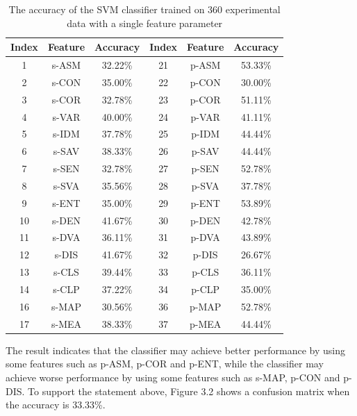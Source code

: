 \begin{table}[!t]
\begin{center}
\renewcommand{\arraystretch}{0.5}
\begin{tabular}{||c c c c c c ||}
\hline
Index & Feature & Accuracy & Index & Feature & Accuracy \\[0.7ex]
\hline\hline
1 & s-ASM & 32.22\% & 21 & p-ASM & 53.33\% \\
2 & s-CON & 35.00\% & 22 & p-CON & 30.00\% \\
3 & s-COR & 32.78\% & 23 & p-COR & 51.11\% \\
4 & s-VAR & 40.00\% & 24 & p-VAR & 41.11\% \\
5 & s-IDM & 37.78\% & 25 & p-IDM & 44.44\% \\
6 & s-SAV & 38.33\% & 26 & p-SAV & 44.44\% \\
7 & s-SEN & 32.78\% & 27 & p-SEN & 52.78\% \\
8 & s-SVA & 35.56\% & 28 & p-SVA & 37.78\% \\
9 & s-ENT & 35.00\% & 29 & p-ENT & 53.89\% \\
10 & s-DEN & 41.67\% & 30 & p-DEN & 42.78\% \\
11 & s-DVA & 36.11\% & 31 & p-DVA & 43.89\% \\
12 & s-DIS & 41.67\% & 32 & p-DIS & 26.67\% \\
13 & s-CLS & 39.44\% & 33 & p-CLS & 36.11\% \\
14 & s-CLP & 37.22\% & 34 & p-CLP & 35.00\% \\
16 & s-MAP & 30.56\% & 36 & p-MAP & 52.78\% \\
17 & s-MEA & 38.33\% & 37 & p-MEA & 44.44\% \\
\hline
\end{tabular}
\caption {The accuracy of the SVM classifier trained on 360 experimental data with a single feature parameter}
\end{center}
\end{table}
The result indicates that the classifier may achieve better performance by using some features such as p-ASM, p-COR and p-ENT, while the classifier may achieve worse performance by using some features such as s-MAP, p-CON and p-DIS. To support the statement above, Figure 3.2 shows a confusion matrix when the accuracy is 33.33\%. 

